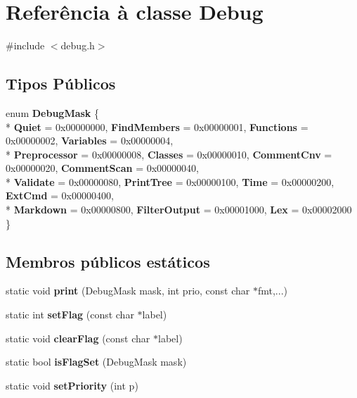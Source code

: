 \hypertarget{class_debug}{\section{Referência à classe Debug}
\label{class_debug}
}


{\ttfamily \#include $<$debug.\-h$>$}

\subsection*{Tipos Públicos}
\begin{DoxyCompactItemize}
\item 
enum {\bfseries Debug\-Mask} \{ \\*
{\bfseries Quiet} = 0x00000000, 
{\bfseries Find\-Members} = 0x00000001, 
{\bfseries Functions} = 0x00000002, 
{\bfseries Variables} = 0x00000004, 
\\*
{\bfseries Preprocessor} = 0x00000008, 
{\bfseries Classes} = 0x00000010, 
{\bfseries Comment\-Cnv} = 0x00000020, 
{\bfseries Comment\-Scan} = 0x00000040, 
\\*
{\bfseries Validate} = 0x00000080, 
{\bfseries Print\-Tree} = 0x00000100, 
{\bfseries Time} = 0x00000200, 
{\bfseries Ext\-Cmd} = 0x00000400, 
\\*
{\bfseries Markdown} = 0x00000800, 
{\bfseries Filter\-Output} = 0x00001000, 
{\bfseries Lex} = 0x00002000
 \}
\end{DoxyCompactItemize}
\subsection*{Membros públicos estáticos}
\begin{DoxyCompactItemize}
\item 
\hypertarget{class_debug_ae113cd4c0fbcedae32db49e20c01d685}{static void {\bfseries print} (Debug\-Mask mask, int prio, const char $\ast$fmt,...)}\label{class_debug_ae113cd4c0fbcedae32db49e20c01d685}

\item 
\hypertarget{class_debug_a9348d6aa69122cca496069a0d4fbea9e}{static int {\bfseries set\-Flag} (const char $\ast$label)}\label{class_debug_a9348d6aa69122cca496069a0d4fbea9e}

\item 
\hypertarget{class_debug_a3e0f37e8fc190da7ce7e0a28dd39e880}{static void {\bfseries clear\-Flag} (const char $\ast$label)}\label{class_debug_a3e0f37e8fc190da7ce7e0a28dd39e880}

\item 
\hypertarget{class_debug_aadc3ca4ebd07b919e292fb0f25c4b563}{static bool {\bfseries is\-Flag\-Set} (Debug\-Mask mask)}\label{class_debug_aadc3ca4ebd07b919e292fb0f25c4b563}

\item 
\hypertarget{class_debug_ab1ffd9a5846e0c4c8eadc6d4679ef68a}{static void {\bfseries set\-Priority} (int p)}\label{class_debug_ab1ffd9a5846e0c4c8eadc6d4679ef68a}

\end{DoxyCompactItemize}


